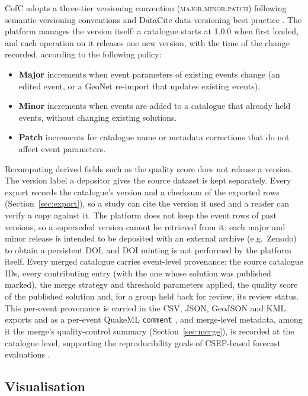 \documentclass[12pt]{article}
\begin{document}
CofC adopts a three-tier versioning convention (\textsc{major.minor.patch})
following semantic-versioning conventions and DataCite data-versioning
best practice \citep{datacite2021}.  The platform manages the version itself:
a catalogue starts at 1.0.0 when first loaded, and each operation on it
releases one new version, with the time of the change recorded, according to
the following policy:
\begin{itemize}[leftmargin=*]
  \item \textbf{Major} increments when event parameters of existing events
    change (an edited event, or a GeoNet re-import that updates existing
    events).
  \item \textbf{Minor} increments when events are added to a catalogue that
    already held events, without changing existing solutions.
  \item \textbf{Patch} increments for catalogue name or metadata corrections
    that do not affect event parameters.
\end{itemize}
Recomputing derived fields such as the quality score does not release a version.
The version label a depositor gives the source dataset is kept separately.
Every export records the catalogue's version and a checksum of the exported rows
(Section~\ref{sec:export}), so a study can cite the version it used and a reader
can verify a copy against it.  The platform does not keep the event rows of
past versions, so a superseded version cannot be retrieved from it: each major
and minor release is intended to be deposited with an external archive (e.g.\
Zenodo) to obtain a persistent DOI, and DOI minting is not performed by the
platform itself.  Every merged catalogue carries event-level provenance: the
source catalogue IDs, every contributing entry (with the one whose solution
was published marked), the merge strategy and threshold parameters applied,
the quality score of the published solution and, for a group held back for
review, its review status.  This per-event provenance is
carried in the CSV, JSON, GeoJSON and KML exports and as a per-event QuakeML
\texttt{comment} \citep{schorlemmer2011}, and merge-level metadata, among it
the merge's quality-control summary (Section~\ref{sec:merge}), is recorded at the
catalogue level, supporting the reproducibility goals of CSEP-based
forecast evaluations \citep{schorlemmer2007}.

\subsection{Visualisation}
\label{sec:viz}
\end{document}

